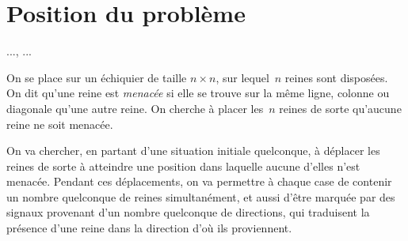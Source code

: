 \section{Position du problème}
\label{sec:intronreines}

...\cite{BahiC06}, \cite{ChevFat08,Fat13}...



On se place sur un échiquier de  taille $n \times n$, sur lequel~$n$ reines sont
disposées. On dit qu'une reine est  \emph{menacée} si elle se trouve sur la même
ligne,  colonne ou diagonale  qu'une autre  reine. On  cherche à  placer les~$n$
reines de sorte qu'aucune reine ne soit menacée.

On va chercher,  en partant d'une situation initiale  quelconque, à déplacer les
reines  de sorte à  atteindre une  position dans  laquelle aucune  d'elles n'est
menacée. Pendant ces déplacements, on va  permettre à chaque case de contenir un
nombre  quelconque de  reines simultanément,  et  aussi d'être  marquée par  des
signaux  provenant  d'un nombre  quelconque  de  directions,  qui traduisent  la
présence d'une reine dans la direction d'où ils proviennent.


